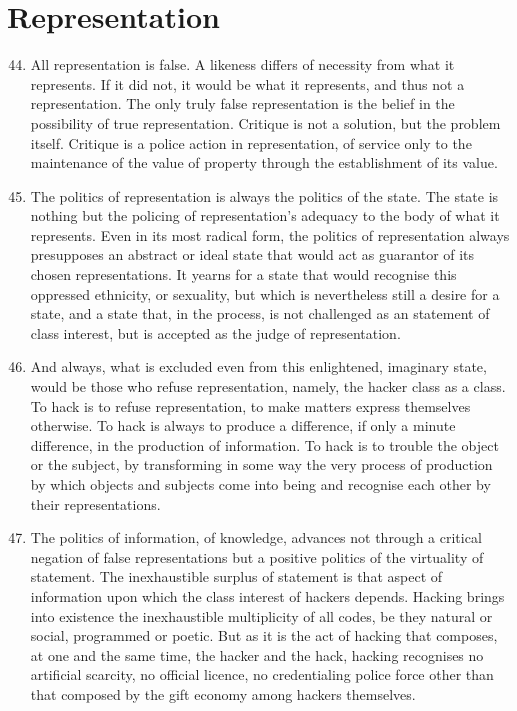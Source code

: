 \documentclass[letterpaper,12pt,english]{sphinxmanual}
\begin{document}
\section{Representation}
\label{wark:representation}\begin{enumerate}
\setcounter{enumi}{43}
\item {} 
All representation is false. A likeness differs of necessity from what it represents. If it did not, it would be what it represents, and thus not a representation. The only truly false representation is the belief in the possibility of true representation. Critique is not a solution, but the problem itself. Critique is a police action in representation, of service only to the maintenance of the value of property through the establishment of its value.

\item {} 
The politics of representation is always the politics of the state. The state is nothing but the policing of representation's adequacy to the body of what it represents. Even in its most radical form, the politics of representation always presupposes an abstract or ideal state that would act as guarantor of its chosen representations. It yearns for a state that would recognise this oppressed ethnicity, or sexuality, but which is nevertheless still a desire for a state, and a state that, in the process, is not challenged as an statement of class interest, but is accepted as the judge of representation.

\item {} 
And always, what is excluded even from this enlightened, imaginary state, would be those who refuse representation, namely, the hacker class as a class. To hack is to refuse representation, to make matters express themselves otherwise. To hack is always to produce a difference, if only a minute difference, in the production of information. To hack is to trouble the object or the subject, by transforming in some way the very process of production by which objects and subjects come into being and recognise each other by their representations.

\item {} 
The politics of information, of knowledge, advances not through a critical negation of false representations but a positive politics of the virtuality of statement. The inexhaustible surplus of statement is that aspect of information upon which the class interest of hackers depends. Hacking brings into existence the inexhaustible multiplicity of all codes, be they natural or social, programmed or poetic. But as it is the act of hacking that composes, at one and the same time, the hacker and the hack, hacking recognises no artificial scarcity, no official licence, no credentialing police force other than that composed by the gift economy among hackers themselves.


\end{enumerate}
\end{document}
